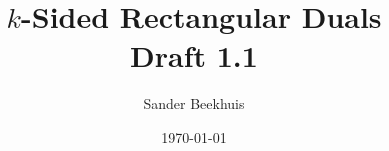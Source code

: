 




%


\title{$k$-Sided Rectangular Duals \\ \normalsize Draft 1.1}
\author{Sander Beekhuis}
\date{\today} %



\maketitle
















%
%
%


\printbibliography

